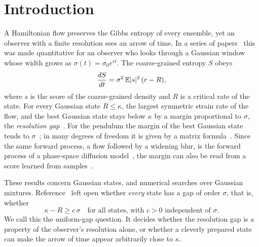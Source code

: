 \section{Introduction}
\label{sec:intro}

A Hamiltonian flow preserves the Gibbs entropy of every ensemble, yet an observer with a finite resolution sees an arrow of time. In a series of papers~\cite{namba2026arrow,namba2026gap,namba2026many,namba2026learned} this was made quantitative for an observer who looks through a Gaussian window whose width grows as $\sigma(t) = \sigma_0 e^{rt}$. The coarse-grained entropy $S$ obeys
\begin{equation}
\frac{dS}{dt} = \sigma^2\,\mathbb{E}|s|^2\,(r - R),
\label{eq:SC}
\end{equation}
where $s$ is the score of the coarse-grained density and $R$ is a critical rate of the state. For every Gaussian state $R \leq \kappa$, the largest symmetric strain rate of the flow, and the best Gaussian state stays below $\kappa$ by a margin proportional to $\sigma$, the \emph{resolution gap}~\cite{namba2026gap}. For the pendulum the margin of the best Gaussian state tends to $\sigma$~\cite{namba2026gap}; in many degrees of freedom it is given by a matrix formula~\cite{namba2026many}. Since the same forward process, a flow followed by a widening blur, is the forward process of a phase-space diffusion model~\cite{dockhorn2022,namba2026threshold}, the margin can also be read from a score learned from samples~\cite{namba2026learned}.

These results concern Gaussian states, and numerical searches over Gaussian mixtures. Reference~\cite{namba2026gap} left open whether \emph{every} state has a gap of order $\sigma$, that is, whether
\begin{equation}
\kappa - R \geq c\,\sigma \quad\text{for all states, with $c > 0$ independent of $\sigma$.}
\label{eq:uniform}
\end{equation}
We call this the uniform-gap question. It decides whether the resolution gap is a property of the observer's resolution alone, or whether a cleverly prepared state can make the arrow of time appear arbitrarily close to $\kappa$.

